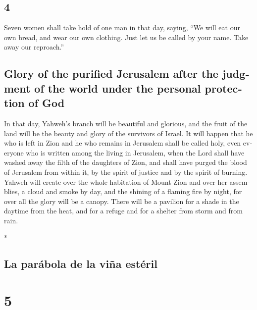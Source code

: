 \begin{paracol}{2}
\begin{otherlanguage}{english}
\hypertarget{section-7}{%
\section{4}\label{section-7}}

 Seven women shall take hold of one man in that day,
saying, ``We will eat our own bread, and wear our own clothing. Just let
us be called by your name. Take away our reproach.''

\hypertarget{glory-of-the-purified-jerusalem-after-the-judgment-of-the-world-under-the-personal-protection-of-god}{%
\subsection{Glory of the purified Jerusalem after the judgment of the
world under the personal protection of
God}\label{glory-of-the-purified-jerusalem-after-the-judgment-of-the-world-under-the-personal-protection-of-god}}

 In that day, Yahweh's branch will be beautiful and
glorious, and the fruit of the land will be the beauty and glory of the
survivors of Israel.  It will happen that he who is left
in Zion and he who remains in Jerusalem shall be called holy, even
everyone who is written among the living in Jerusalem, 
when the Lord shall have washed away the filth of the daughters of Zion,
and shall have purged the blood of Jerusalem from within it, by the
spirit of justice and by the spirit of burning.  Yahweh
will create over the whole habitation of Mount Zion and over her
assemblies, a cloud and smoke by day, and the shining of a flaming fire
by night, for over all the glory will be a canopy.  There
will be a pavilion for a shade in the daytime from the heat, and for a
refuge and for a shelter from storm and from rain.

\end{otherlanguage}

\switchcolumn[0]*

\hypertarget{la-paruxe1bola-de-la-viuxf1a-estuxe9ril}{%
\subsection{La parábola de la viña
estéril}\label{la-paruxe1bola-de-la-viuxf1a-estuxe9ril}}

\hypertarget{section-8}{%
\section{5}\label{section-8}}


\end{paracol}
